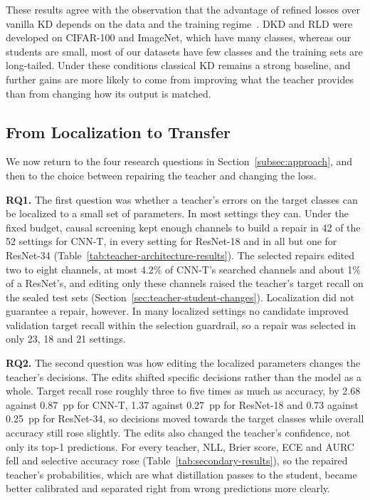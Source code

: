 \documentclass[review,number,sort&compress]{elsarticle}
\theoremstyle{definition}
\begin{document}
These results agree with the observation that the advantage of refined
losses over vanilla KD depends on the data and the training
regime~\citep{hao2023revisit}. DKD and RLD were developed on CIFAR-100
and ImageNet, which have many classes, whereas our students are small,
most of our datasets have few classes and the training sets are
long-tailed. Under these conditions classical KD remains a strong
baseline, and further gains are more likely to come from improving what
the teacher provides than from changing how its output is matched.

\subsection{From Localization to Transfer}
\label{sec:discussion-rqs}

We now return to the four research questions in
Section~\ref{subsec:approach}, and then to the choice between repairing
the teacher and changing the loss.

\textbf{RQ1.} The first question was whether a teacher's errors on the
target classes can be localized to a small set of parameters. In most
settings they can. Under the fixed budget, causal screening kept enough
channels to build a repair in 42 of the 52 settings for CNN-T, in every
setting for ResNet-18 and in all but one for ResNet-34
(Table~\ref{tab:teacher-architecture-results}). The selected repairs
edited two to eight channels, at most 4.2\% of CNN-T's searched
channels and about 1\% of a ResNet's, and editing only these channels
raised the teacher's target recall on the sealed test sets
(Section~\ref{sec:teacher-student-changes}). Localization did not
guarantee a repair, however. In many localized settings no candidate
improved validation target recall within the selection guardrail, so a
repair was selected in only 23, 18 and 21 settings.

\textbf{RQ2.} The second question was how editing the localized
parameters changes the teacher's decisions. The edits shifted specific
decisions rather than the model as a whole. Target recall rose roughly
three to five times as much as accuracy, by 2.68 against 0.87~pp for
CNN-T, 1.37 against 0.27~pp for ResNet-18 and 0.73 against 0.25~pp for
ResNet-34, so decisions moved towards the target classes while overall
accuracy still rose slightly. The edits also changed
the teacher's confidence, not only its top-1 predictions. For every
teacher, NLL, Brier score, ECE and AURC fell and selective accuracy rose
(Table~\ref{tab:secondary-results}), so the repaired teacher's
probabilities, which are what distillation passes to the student,
became better calibrated and separated right from wrong predictions
more clearly.
\end{document}
